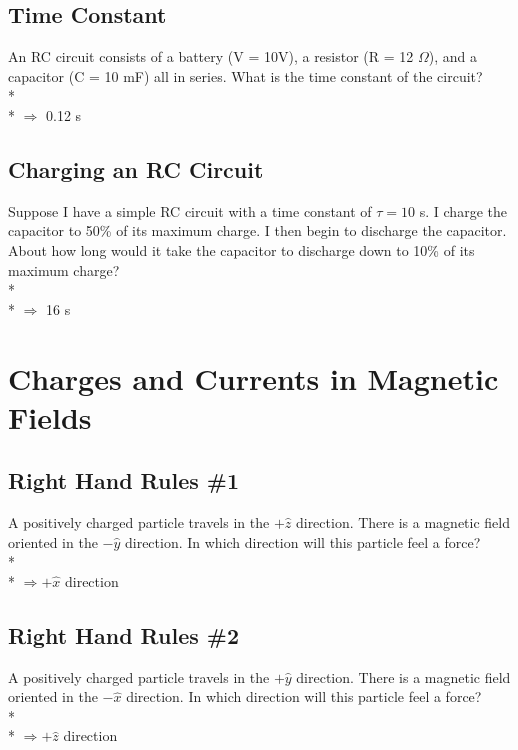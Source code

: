 \documentclass[11pt]{article}
\begin{document}
\subsection{Time Constant}
An RC circuit consists of a battery (V = 10V), a resistor (R = 12 $\Omega$), and a capacitor (C = 10 mF) all in series.  What is the time constant of the circuit? \\* \\*
$\Rightarrow$ 0.12 s

\subsection{Charging an RC Circuit}
Suppose I have a simple RC circuit with a time constant of $\tau = 10$ s.  I charge the capacitor to 50\% of its maximum charge.  I then begin to discharge the capacitor.  About how long would it take the capacitor to discharge down to 10\% of its maximum charge?\\* \\*
$\Rightarrow$ 16 s


\pagebreak
\section{Charges and Currents in Magnetic Fields}
\vspace{10pt}

\subsection{Right Hand Rules \#1}
A positively charged particle travels in the $+\hat{z}$ direction.  There is a magnetic field oriented in the $-\hat{y}$ direction.  In which direction will this particle feel a force? \\* \\*
$\Rightarrow +\hat{x}$ direction

\subsection{Right Hand Rules \#2}
A positively charged particle travels in the $+\hat{y}$ direction.  There is a magnetic field oriented in the $-\hat{x}$ direction.  In which direction will this particle feel a force? \\* \\*
$\Rightarrow +\hat{z}$ direction
\end{document}
